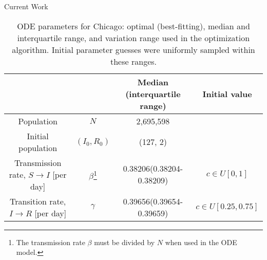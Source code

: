 \begin{slide}{Current Work}
	\begin{table}[h]
		\centering
		\caption{ODE parameters for Chicago: optimal (best-fitting), median and interquartile range, and variation range used in the optimization algorithm. Initial parameter guesses were uniformly sampled within these ranges.}
		\label{tab:parameters}
		\begin{tabular}{ c c c c }
			\hline
			\hline
			&	&	Median (interquartile range)	&	Initial value \\
			\hline
			Population	&	$N$	&	2,695,598	& \\
			Initial population	&	$(I_0, R_0)$	&	(127, 2)	& \\
			Transmission rate, $S \rightarrow I$ [per day]	&	$\beta$\footnote{The transmission rate $\beta$ must be divided by $N$ when used in the ODE model.}	&	0.38206(0.38204-0.38209)	&	$c \in U[0,1]$ \\
			Transition rate, $I \rightarrow R$ [per day]	&	$\gamma$	&	 0.39656(0.39654-0.39659)	&	$c \in U[0.25,0.75]$ \\
			\hline
			\hline
		\end{tabular}
	\end{table}
\end{slide}